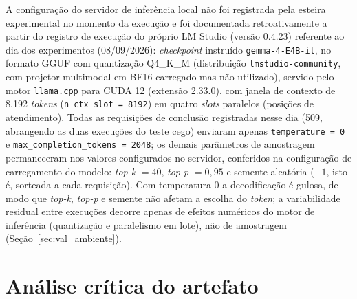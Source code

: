 \begin{apendicesenv}
A configuração do servidor de inferência local não foi registrada pela esteira experimental no momento da execução e foi documentada retroativamente a partir do registro de execução do próprio LM Studio (versão 0.4.23) referente ao dia dos experimentos (08/09/2026): \textit{checkpoint} instruído \texttt{gemma-4-E4B-it}, no formato GGUF com quantização Q4\_K\_M (distribuição \texttt{lmstudio-community}, com projetor multimodal em BF16 carregado mas não utilizado), servido pelo motor \texttt{llama.cpp} para CUDA 12 (extensão 2.33.0), com janela de contexto de 8.192 \textit{tokens} (\texttt{n\_ctx\_slot = 8192}) em quatro \textit{slots} paralelos (posições de atendimento). Todas as requisições de conclusão registradas nesse dia (509, abrangendo as duas execuções do teste cego) enviaram apenas \texttt{temperature = 0} e \texttt{max\_completion\_tokens = 2048}; os demais parâmetros de amostragem permaneceram nos valores configurados no servidor, conferidos na configuração de carregamento do modelo: \textit{top-k} $= 40$, \textit{top-p} $= 0{,}95$ e semente aleatória ($-1$, isto é, sorteada a cada requisição). Com temperatura 0 a decodificação é gulosa, de modo que \textit{top-k}, \textit{top-p} e semente não afetam a escolha do \textit{token}; a variabilidade residual entre execuções decorre apenas de efeitos numéricos do motor de inferência (quantização e paralelismo em lote), não de amostragem (Seção~\ref{sec:val_ambiente}).

\section{Análise crítica do artefato}
\label{sec:apendice_prompt_critica}


\end{apendicesenv}
